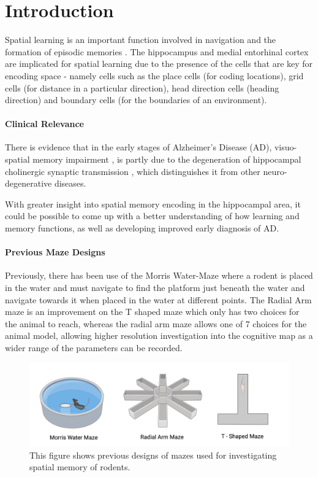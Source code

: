 \section{Introduction}

Spatial learning is an important function involved in navigation and the formation of episodic memories \cite{spatial_learning_memory}.
The hippocampus and medial entorhinal cortex are implicated for spatial learning due to the presence of the cells that are key for encoding space - namely cells such as the place cells (for coding locations), grid cells (for distance in a particular direction), head direction cells (heading direction) and boundary cells (for the boundaries of an environment).

\paragraph{Clinical Relevance}

There is evidence that in the early stages of Alzheimer's Disease (AD), visuo-spatial memory impairment \cite{Diagnosis}, is partly due to the degeneration of hippocampal cholinergic synaptic transmission \cite{Impairments}, which distinguishes it from other neuro-degenerative diseases.


With greater insight into spatial memory encoding in the hippocampal area, it could be possible to come up with a better understanding of how learning and memory functions, as well as developing improved early diagnosis of AD.

\paragraph{Previous Maze Designs}

Previously, there has been use of the Morris Water-Maze \cite{morris_water_maze} where a rodent is placed in the water and must navigate to find the platform just beneath the water and navigate towards it when placed in the water at different points.
The Radial Arm maze \cite{radial_arm_maze} is an improvement on the T shaped maze \cite{t-maze} which only has two choices for the animal to reach, whereas the radial arm maze allows one of 7 choices for the animal model, allowing higher resolution investigation into the cognitive map as a wider range of the parameters can be recorded.

\begin{figure}[h]
    \centering
    \includegraphics[scale=0.4]{images/previous_maze_designs.png}
    \caption{This figure shows previous designs of mazes used for investigating spatial memory of rodents.}
    \label{fig:previous_maze_designs}
\end{figure}

